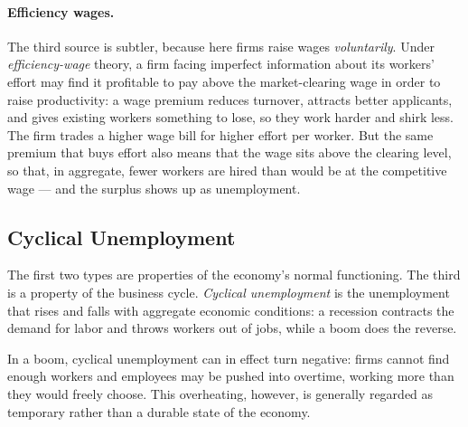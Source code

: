 \paragraph{Efficiency wages.}
The third source is subtler, because here firms raise wages \emph{voluntarily}. Under \emph{efficiency-wage} theory, a firm facing imperfect information about its workers' effort may find it profitable to pay above the market-clearing wage in order to raise productivity: a wage premium reduces turnover, attracts better applicants, and gives existing workers something to lose, so they work harder and shirk less. The firm trades a higher wage bill for higher effort per worker. But the same premium that buys effort also means that the wage sits above the clearing level, so that, in aggregate, fewer workers are hired than would be at the competitive wage --- and the surplus shows up as unemployment.


\subsection{Cyclical Unemployment}

The first two types are properties of the economy's normal functioning. The third is a property of the business cycle. \emph{Cyclical unemployment} is the unemployment that rises and falls with aggregate economic conditions: a recession contracts the demand for labor and throws workers out of jobs, while a boom does the reverse.


In a boom, cyclical unemployment can in effect turn negative: firms cannot find enough workers and employees may be pushed into overtime, working more than they would freely choose. This overheating, however, is generally regarded as temporary rather than a durable state of the economy.

